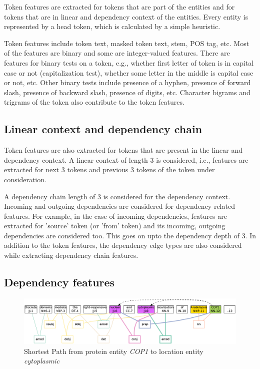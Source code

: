 Token features are extracted for tokens that are part of the entities and for tokens that are in linear and dependency context of the entities. Every entity is represented by a head token, which is calculated by a simple heuristic.

Token features include token text, masked token text, stem, POS tag, etc. Most of the features are binary and some are integer-valued features. There are features for binary tests on a token, e.g., whether first letter of token is in capital case or not (capitalization test), whether some letter in the middle is capital case or not, etc. Other binary tests include presence of a hyphen, presence of forward slash, presence of backward slash, presence of digits, etc. Character bigrams and trigrams of the token also contribute to the token features.

\subsection*{Linear context and dependency chain}

Token features are also extracted for tokens that are present in the linear and dependency context. A linear context of length 3 is considered, i.e., features are extracted for next 3 tokens and previous 3 tokens of the token under consideration.

A dependency chain length of 3 is considered for the dependency context. Incoming and outgoing dependencies are considered for dependency related features. For example, in the case of incoming dependencies, features are extracted for 'source' token (or 'from' token) and its incoming, outgoing dependencies are considered too. This goes on upto the dependency depth of 3. In addition to the token features, the dependency edge types are also considered while extracting dependency chain features.

\subsection*{Dependency features}

\begin{figure}
\centering
\includegraphics[scale=0.3]{figures/ShortestPath.png}
\caption{Shortest Path from protein entity \textit{COP1} to location entity \textit{cytoplasmic}}\label{fig:shortPath}
\end{figure}

